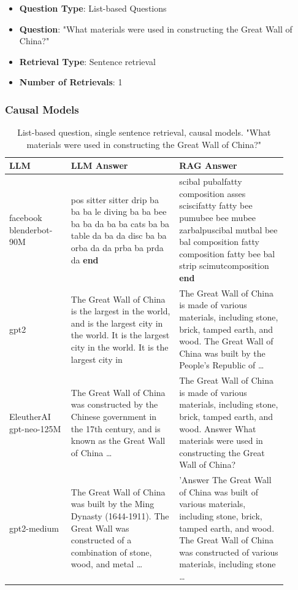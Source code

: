 \documentclass{wseas}
\begin{document}
\begin{itemize}
\item
  \textbf{Question Type}: List-based Questions
\item
  \textbf{Question}: "What materials were used in constructing the Great Wall of China?"
\item
  \textbf{Retrieval Type}: Sentence retrieval
\item
  \textbf{Number of Retrievals}: 1
\end{itemize}

\subsubsection{Causal Models}

\begin{table}[htbp]
  \centering
  \caption{List-based question, single sentence retrieval, causal models. "What materials were used in constructing the Great Wall of China?"}
  \label{tab:experiment_Q_listBased_R_1Sentence_Q_listBased_M_casualModel_table}  
  \begin{tabular}{|p{0.20\linewidth}|p{0.35\linewidth}|p{0.35\linewidth}|}
    \hline
    \textbf{LLM} & \textbf{LLM Answer} & \textbf{RAG Answer} \\ \hline
    facebook blenderbot-90M & pos sitter sitter drip ba ba ba le diving ba ba bee ba ba da ba ba cats ba ba table da ba da disc ba ba orba da da prba ba prda da \textbf{end} & scibal pubalfatty composition asses sciscifatty fatty bee pumubee bee mubee zarbalpuscibal mutbal bee bal composition fatty composition fatty bee bal strip scimutcomposition \textbf{end} \\ \hline
    gpt2 & The Great Wall of China is the largest in the world, and is the largest city in the world. It is the largest city in the world. It is the largest city in & The Great Wall of China is made of various materials, including stone, brick, tamped earth, and wood. The Great Wall of China was built by the People's Republic of \ldots{} \\ \hline
    EleutherAI gpt-neo-125M & The Great Wall of China was constructed by the Chinese government in the 17th century, and is known as the Great Wall of China \ldots{} & The Great Wall of China is made of various materials, including stone, brick, tamped earth, and wood. Answer What materials were used in constructing the Great Wall of China? \\ \hline
    gpt2-medium & The Great Wall of China was built by the Ming Dynasty (1644-1911). The Great Wall was constructed of a combination of stone, wood, and metal \ldots{} & 'Answer The Great Wall of China was built of various materials, including stone, brick, tamped earth, and wood. The Great Wall of China was constructed of various materials, including stone \ldots{} \\ \hline

\end{tabular}
\end{table}
\end{document}
